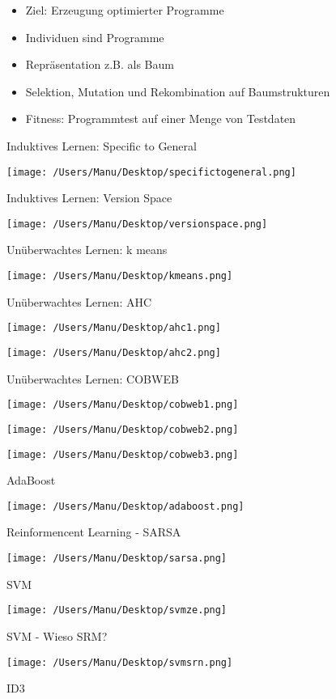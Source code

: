 \documentclass[paper=a4, fontsize=11pt]{scrartcl} %
\numberwithin{equation}{section} %
\numberwithin{figure}{section} %
\numberwithin{table}{section} %
\begin{document}
\begin{itemize}
\item Ziel: Erzeugung optimierter Programme
\item Individuen sind Programme
\item Repräsentation z.B. als Baum
\item Selektion, Mutation und Rekombination auf Baumstrukturen
\item Fitness: Programmtest auf einer Menge von Testdaten
\end{itemize}

\newpage

Induktives Lernen: Specific to General

\texttt{[image: /Users/Manu/Desktop/specifictogeneral.png]}

Induktives Lernen: Version Space

\texttt{[image: /Users/Manu/Desktop/versionspace.png]}

Unüberwachtes Lernen: k means

\texttt{[image: /Users/Manu/Desktop/kmeans.png]}

Unüberwachtes Lernen: AHC

\texttt{[image: /Users/Manu/Desktop/ahc1.png]}

\texttt{[image: /Users/Manu/Desktop/ahc2.png]}

Unüberwachtes Lernen: COBWEB

\texttt{[image: /Users/Manu/Desktop/cobweb1.png]}

\texttt{[image: /Users/Manu/Desktop/cobweb2.png]}

\texttt{[image: /Users/Manu/Desktop/cobweb3.png]}

AdaBoost

\texttt{[image: /Users/Manu/Desktop/adaboost.png]}

Reinformencent Learning - SARSA

\texttt{[image: /Users/Manu/Desktop/sarsa.png]}

SVM

\texttt{[image: /Users/Manu/Desktop/svmze.png]}

SVM - Wieso SRM?

\texttt{[image: /Users/Manu/Desktop/svmsrn.png]}

ID3
\end{document}
